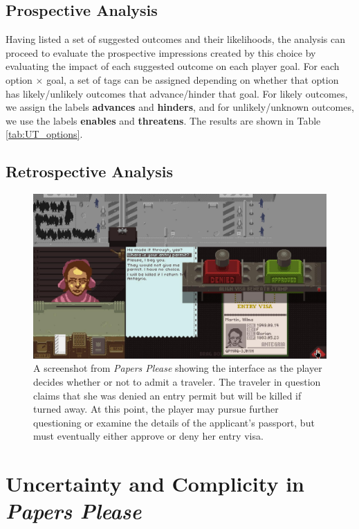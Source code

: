 \documentclass[arts,article,submit,moreauthors,pdftex,10pt,a4paper]{Definitions/mdpi}
\newcommand{\enables}{\textbf{\color{enables}enables}}
\newcommand{\advances}{\textbf{\color{advances}advances}}
\newcommand{\threatens}{\textbf{\color{threatens}threatens}}
\newcommand{\hinders}{\textbf{\color{hinders}hinders}}
\begin{document}
\subsection{Prospective Analysis}

\label{sec:prospective_labels}

Having listed a set of suggested outcomes and their likelihoods, the analysis can proceed to evaluate the prospective impressions created by this choice by evaluating the impact of each suggested outcome on each player goal.
%
For each option $\times$ goal, a set of tags can be assigned depending on whether that option has likely/unlikely outcomes that advance/hinder that goal.
%
For likely outcomes, we assign the labels \advances{} and \hinders{}, and for unlikely/unknown outcomes, we use the labels \enables{} and \threatens{}.
%
The results are shown in Table \ref{tab:UT_options}.



\subsection{Retrospective Analysis}

\begin{figure}[H]
  \includegraphics[width=\textwidth]{fig/papers-please-visa-choice.png}
  \caption{A screenshot from \emph{Papers Please} showing the interface as the player decides whether or not to admit a traveler. The traveler in question claims that she was denied an entry permit but will be killed if turned away. At this point, the player may pursue further questioning or examine the details of the applicant's passport, but must eventually either approve or deny her entry visa.}
  \label{fig:PP_visa}
\end{figure}

\section{Uncertainty and Complicity in \emph{Papers Please}}
\end{document}
